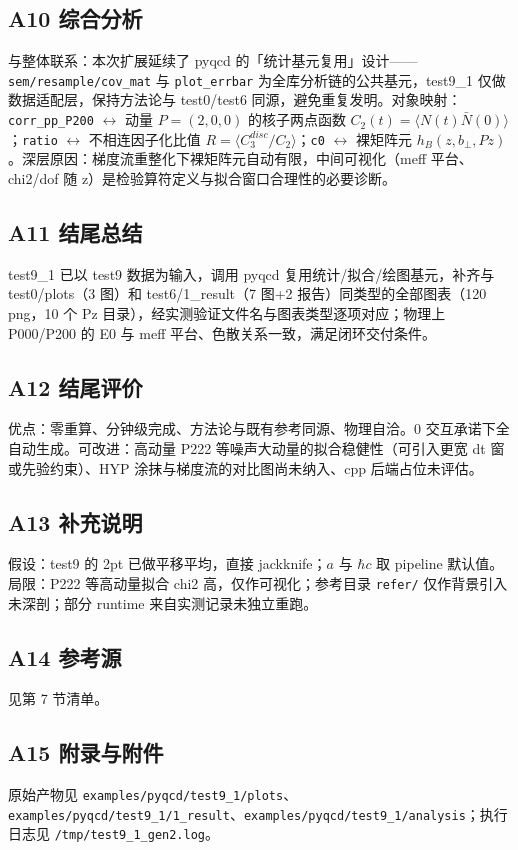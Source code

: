 \documentclass[UTF8]{ctexart}
\begin{document}
\subsection{A10 综合分析}
与整体联系：本次扩展延续了 pyqcd 的「统计基元复用」设计——\texttt{sem/resample/cov\_mat} 与 \texttt{plot\_errbar} 为全库分析链的公共基元，test9\_1 仅做数据适配层，保持方法论与 test0/test6 同源，避免重复发明。对象映射：\texttt{corr\_pp\_P200} $\leftrightarrow$ 动量 $P=(2,0,0)$ 的核子两点函数 $C_2(t)=\langle N(t) \bar N(0)\rangle$；\texttt{ratio} $\leftrightarrow$ 不相连因子化比值 $R=\langle C_3^{disc}/C_2\rangle$；\texttt{c0} $\leftrightarrow$ 裸矩阵元 $h_B(z,b_\perp,Pz)$。深层原因：梯度流重整化下裸矩阵元自动有限，中间可视化（meff 平台、chi2/dof 随 z）是检验算符定义与拟合窗口合理性的必要诊断。

\subsection{A11 结尾总结}
\begin{conclbox}
test9\_1 已以 test9 数据为输入，调用 pyqcd 复用统计/拟合/绘图基元，补齐与 test0/plots（3 图）和 test6/1\_result（7 图+2 报告）同类型的全部图表（120 png，10 个 Pz 目录），经实测验证文件名与图表类型逐项对应；物理上 P000/P200 的 E0 与 meff 平台、色散关系一致，满足闭环交付条件。
\end{conclbox}

\subsection{A12 结尾评价}
优点：零重算、分钟级完成、方法论与既有参考同源、物理自洽。0 交互承诺下全自动生成。可改进：高动量 P222 等噪声大动量的拟合稳健性（可引入更宽 dt 窗或先验约束）、HYP 涂抹与梯度流的对比图尚未纳入、cpp 后端占位未评估。

\subsection{A13 补充说明}
假设：test9 的 2pt 已做平移平均，直接 jackknife；$a$ 与 $\hbar c$ 取 pipeline 默认值。局限：P222 等高动量拟合 chi2 高，仅作可视化；参考目录 \texttt{refer/} 仅作背景引入未深剖；部分 runtime 来自实测记录未独立重跑。

\subsection{A14 参考源}
见第 7 节清单。

\subsection{A15 附录与附件}
原始产物见 \texttt{examples/pyqcd/test9\_1/plots}、\texttt{examples/pyqcd/test9\_1/1\_result}、\texttt{examples/pyqcd/test9\_1/analysis}；执行日志见 \texttt{/tmp/test9\_1\_gen2.log}。
\end{document}
